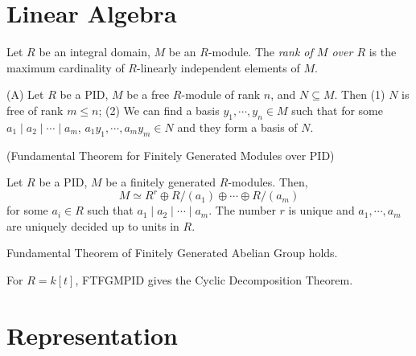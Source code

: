\documentclass{article}
\begin{document}
\section*{Linear Algebra}

\begin{definition}
  Let \(R\) be an integral domain, \(M\) be an \(R\)-module.
  The \emph{rank of \(M\) over \(R\)}
  is the maximum cardinality of \(R\)-linearly independent elements of \(M\).
\end{definition}

\begin{theorem}(A)
  Let \(R\) be a PID, \(M\) be a free \(R\)-module of rank \(n\),
  and \(N \subseteq M\).
  Then
  (1) \(N\) is free of rank \(m \le n\);
  (2) We can find a basis \(y_1, \cdots, y_n \in M\) such that
  for some \(a_1 \mid a_2 \mid \cdots \mid a_m\),
  \(a_1y_1, \cdots, a_my_m \in N\)
  and they form a basis of \(N\).
\end{theorem}

\begin{theorem}(Fundamental Theorem for Finitely Generated Modules over PID)
  
  Let \(R\) be a PID, \(M\) be a finitely generated \(R\)-modules.
  Then,
  \[M \simeq R^r \oplus R/(a_1) \oplus \cdots \oplus R/(a_m)\]
  for some \(a_i \in R\) such that \(a_1 \mid a_2 \mid \cdots \mid a_m\).
  The number \(r\) is unique and \(a_1, \cdots, a_m\)
  are uniquely decided up to units in \(R\).
\end{theorem}

\begin{corollary}
  Fundamental Theorem of Finitely Generated Abelian Group holds.
\end{corollary}

\begin{corollary}
  For \(R = k[t]\), FTFGMPID gives the Cyclic Decomposition Theorem.
\end{corollary}

\section*{Representation}
\end{document}
